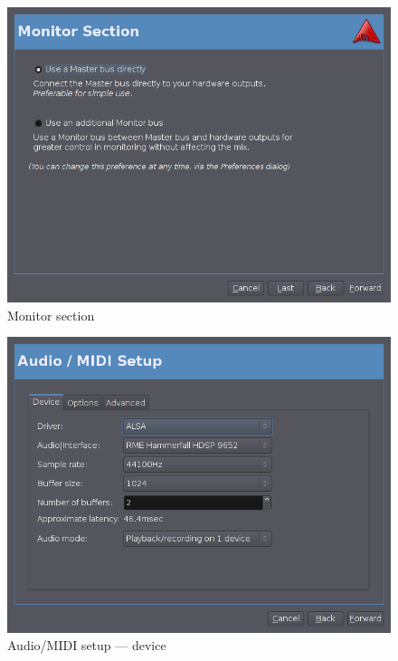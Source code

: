 \documentclass{book}
\begin{document}
\begin{figure}[ht]
\begin{center}
\includegraphics[scale=0.5]{screenshots/monitor-section.png}
\end{center}
\caption{Monitor section}
\label{fig:monitor-section}
\end{figure}

\begin{figure}[ht]
\begin{center}
\includegraphics[scale=0.5]{screenshots/audio-midi-setup-device.png}
\end{center}
\caption{Audio/MIDI setup --- device}
\label{fig:audio-midi-setup-device}
\end{figure}
\end{document}
